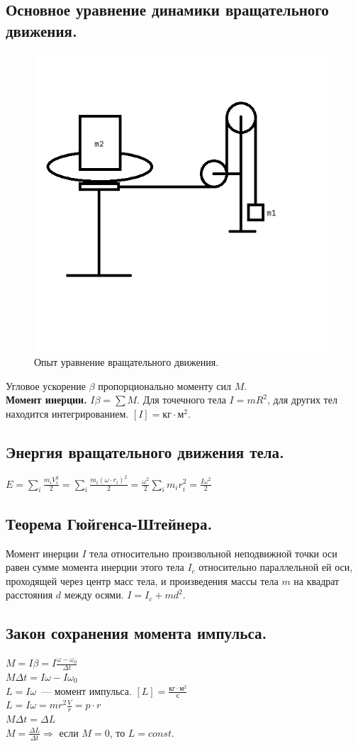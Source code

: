 \documentclass{article}
\begin{document}
	\subsection{Основное уравнение динамики вращательного движения.}
	\begin{figure}[H]
		\includegraphics[height=0.5\textwidth]{extra-materials/УравнениеВращательногоДвиженияОпыт}
		\caption{Опыт уравнение вращательного движения.}
	\end{figure}
	Угловое ускорение $\beta$ пропорционально моменту сил $M$. \\
	\textbf{Момент инерции.} $I \beta = \sum M$. Для точечного тела $I = mR^2$, для других тел находится интегрированием. $[I] = \text{кг} \cdot \text{м}^2$.
	\subsection{Энергия вращательного движения тела.}
	$E = \sum \limits_i \frac{m_iV_i^2}{2} = \sum \limits_i \frac{m_i(\omega \cdot r_i)^2}{2} = \frac{\omega^2}{2} \sum \limits_i m_ir_i^2 = \frac{I\omega^2}{2}$
	\subsection{Теорема Гюйгенса-Штейнера.}
	Момент инерции $I$ тела относительно произвольной неподвижной точки оси равен сумме момента инерции этого тела $I_c$ относительно параллельной ей оси, проходящей через центр масс тела, и произведения массы тела $m$ на квадрат расстояния $d$ между осями. $I = I_c + md^2$.
	\subsection{Закон сохранения момента импульса.}
	$M = I \beta = I \frac{\omega - \omega_0}{\varDelta t}$ \\
	$M \varDelta t = I \omega - I \omega_0$ \\
	$L = I \omega$~--- момент импульса. $[L] = \frac{\text{кг} \cdot \text{м}^2}{\text{с}}$ \\
	$L = I \omega = m r^2 \frac{V}{r} = p \cdot r$ \\
	$M \varDelta t = \varDelta L$ \\
	$M = \frac{\varDelta L}{\varDelta t} \Rightarrow$ если $M = 0$, то $L = const$.
\end{document}
